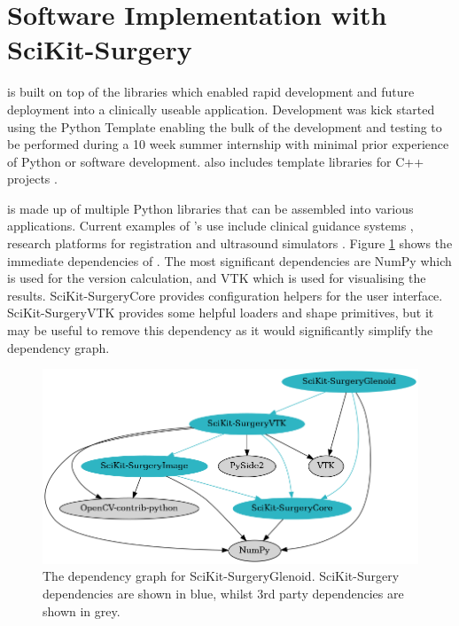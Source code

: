 \section{Software Implementation with SciKit-Surgery}
\sksglenoid is built on top of the \sksurgery \cite{PMID:32436132} libraries which enabled
rapid development and future deployment into a clinically useable application. 
Development was kick started using the \sksurgery Python Template \cite{doel_tom_2022_5879146} enabling the bulk of the development and testing to be performed during a 10 week summer internship with minimal prior experience of Python or software development. \sksurgery also includes template libraries for C++ projects \cite{dowrick2021cmakecatchtemplate}.

\sksurgery is made up of multiple Python libraries that can be assembled into 
various applications. Current examples of \sksurgeryns's use include clinical 
guidance systems \cite{schneider2020comparison}, research platforms for registration \cite{thompson2021fiducial} and ultrasound simulators \cite{thompson2020snappysonic}. 
Figure \ref{fig:deps} shows the immediate dependencies of \sksglenoidns. The most significant dependencies are NumPy\cite{2020NumPy-Array} which is used for the version calculation, and {VTK}\cite{Schroeder:1998:VTO:272980} which is used for visualising the results. SciKit-SurgeryCore provides configuration helpers for the user interface. SciKit-SurgeryVTK provides some helpful loaders and shape primitives, but it may be useful to remove this dependency as it would significantly simplify the dependency graph.

\begin{figure}
	\begin{center}
		\includegraphics[width=0.6\linewidth]{figures/dep_graph.png}
			\caption{\label{fig:deps}The dependency graph for SciKit-SurgeryGlenoid. SciKit-Surgery dependencies are shown in blue, whilst 3rd party dependencies are shown in grey.}
	\end{center}
\end{figure}

